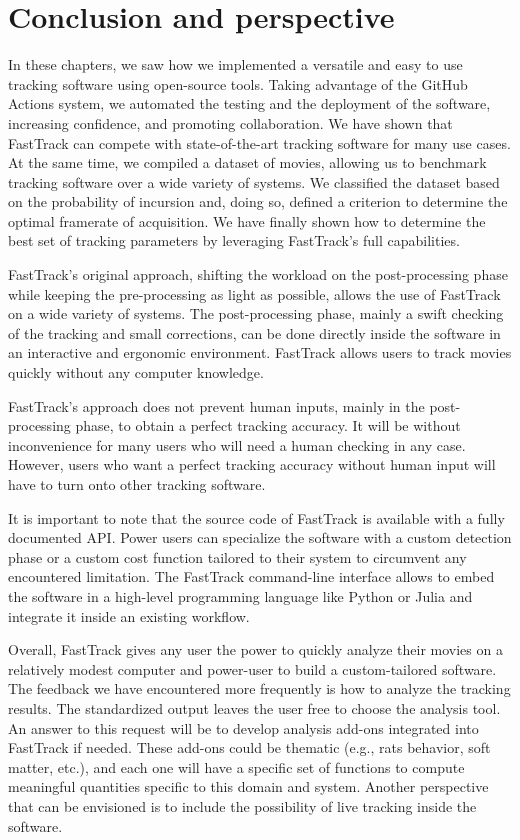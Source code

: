 \chapter{Conclusion and perspective}
    In these chapters, we saw how we implemented a versatile and easy to use tracking software using open-source tools. Taking advantage of the GitHub Actions system, we automated the testing and the deployment of the software, increasing confidence, and promoting collaboration. We have shown that FastTrack can compete with state-of-the-art tracking software for many use cases. At the same time, we compiled a dataset of movies, allowing us to benchmark tracking software over a wide variety of systems. We classified the dataset based on the probability of incursion and, doing so, defined a criterion to determine the optimal framerate of acquisition. We have finally shown how to determine the best set of tracking parameters by leveraging FastTrack's full capabilities.

    FastTrack's original approach, shifting the workload on the post-processing phase while keeping the pre-processing as light as possible, allows the use of FastTrack on a wide variety of systems. The post-processing phase, mainly a swift checking of the tracking and small corrections, can be done directly inside the software in an interactive and ergonomic environment. FastTrack allows users to track movies quickly without any computer knowledge.

    FastTrack's approach does not prevent human inputs, mainly in the post-processing phase, to obtain a perfect tracking accuracy. It will be without inconvenience for many users who will need a human checking in any case. However, users who want a perfect tracking accuracy without human input will have to turn onto other tracking software.

    It is important to note that the source code of FastTrack is available with a fully documented API. Power users can specialize the software with a custom detection phase or a custom cost function tailored to their system to circumvent any encountered limitation. The FastTrack command-line interface allows to embed the software in a high-level programming language like Python or Julia and integrate it inside an existing workflow.

    Overall, FastTrack gives any user the power to quickly analyze their movies on a relatively modest computer and power-user to build a custom-tailored software. The feedback we have encountered more frequently is how to analyze the tracking results. The standardized output leaves the user free to choose the analysis tool. An answer to this request will be to develop analysis add-ons integrated into FastTrack if needed. These add-ons could be thematic (e.g., rats behavior, soft matter, etc.), and each one will have a specific set of functions to compute meaningful quantities specific to this domain and system. Another perspective that can be envisioned is to include the possibility of live tracking inside the software.



